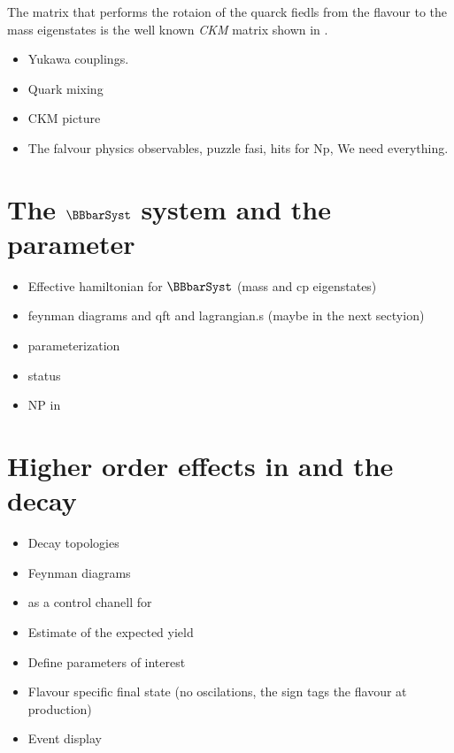 The matrix that performs the rotaion of the quarck fiedls from the flavour to the mass eigenstates is the
well known {\it CKM} matrix shown in \equref{}.

\begin{itemize}
  \item Yukawa couplings.
  \item Quark mixing
  \item CKM picture
  \item The falvour physics observables, puzzle fasi, hits for Np, We need everything.
\end{itemize}


\section{The $\BBbarSyst$ system and the \phis parameter}
\label{Phenomenology}

\begin{itemize}
  \item Effective hamiltonian for $\BBbarSyst$ (mass and cp eigenstates)
  \item feynman diagrams and qft and lagrangian.s (maybe in the next sectyion)
  \item \phis parameterization
  \item \phis status
  \item NP in \phis
\end{itemize}

\section{Higher order effects in \phis and the \BsJpsiKst decay}
\label{TheBsJpsiKstDecay}

\begin{itemize}
\item Decay topologies
\item Feynman diagrams
\item \BsJpsiKst as a control chanell for \phis
\item Estimate of the expected yield
\item Define parameters of interest
\item Flavour specific final state (no oscilations, the sign tags the flavour at production)
\item Event display
\end{itemize}



